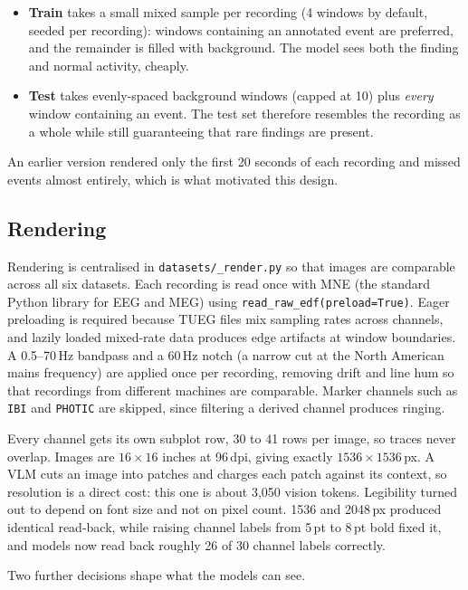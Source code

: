 \documentclass[11pt,a4paper]{article}
\newcommand{\file}[1]{{\small\texttt{#1}}}
\begin{document}
\begin{itemize}
\item \textbf{Train} takes a small mixed sample per recording (4 windows by
      default, seeded per recording): windows containing an annotated event are
      preferred, and the remainder is filled with background. The model sees both
      the finding and normal activity, cheaply.
\item \textbf{Test} takes evenly-spaced background windows (capped at 10) plus
      \emph{every} window containing an event. The test set therefore resembles
      the recording as a whole while still guaranteeing that rare findings are
      present.
\end{itemize}

An earlier version rendered only the first 20 seconds of each recording and
missed events almost entirely, which is what motivated this design.

\subsection{Rendering}

Rendering is centralised in \file{datasets/\_render.py} so that images are
comparable across all six datasets. Each recording is read once with MNE (the
standard Python library for EEG and MEG) using
\texttt{read\_raw\_edf(preload=True)}. Eager preloading is required because TUEG
files mix sampling rates across channels, and lazily loaded mixed-rate data
produces edge artifacts at window boundaries. A 0.5--70\,Hz bandpass and a
60\,Hz notch (a narrow cut at the North American mains frequency) are applied once
per recording, removing drift and line hum so that recordings from different
machines are comparable. Marker channels such as \texttt{IBI} and
\texttt{PHOTIC} are skipped, since filtering a derived channel produces ringing.

Every channel gets its own subplot row, 30 to 41 rows per image, so traces never
overlap. Images are $16\times16$ inches at 96\,dpi, giving exactly
$1536\times1536$\,px. A VLM cuts an image into patches and charges each patch
against its context, so resolution is a direct cost: this one is about 3{,}050
vision tokens. Legibility turned out to depend on font size and not on pixel
count. 1536 and 2048\,px produced identical read-back, while raising channel
labels from 5\,pt to 8\,pt bold fixed it, and models now read back roughly 26 of
30 channel labels correctly.

Two further decisions shape what the models can see.
\end{document}
